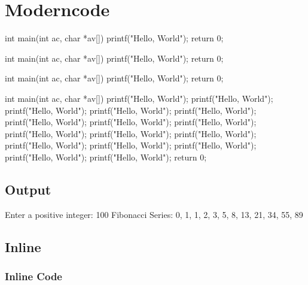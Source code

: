 \documentclass[10pt]{article}
\begin{document}
\section{Moderncode}

\begin{moderncode}[C][adjusted title={Title}]
int main(int ac, char *av[])
{
	printf("Hello, World");
	return 0;
}
\end{moderncode}

\begin{moderncode}[C][adjusted title={This title is very very very very very very very very very long}]
int main(int ac, char *av[])
{
	printf("Hello, World");
	return 0;
}
\end{moderncode}

\begin{moderncode}[C]
int main(int ac, char *av[])
{
	printf("Hello, World");
	return 0;
}
\end{moderncode}

\begin{moderncode}[C][adjusted title={This is a very long code}]
int main(int ac, char *av[])
{
	printf("Hello, World");
	printf("Hello, World");
	printf("Hello, World");
	printf("Hello, World");
	printf("Hello, World");
	printf("Hello, World");
	printf("Hello, World");
	printf("Hello, World");
	printf("Hello, World");
	printf("Hello, World");
	printf("Hello, World");
	printf("Hello, World");
	printf("Hello, World");
	printf("Hello, World");
	printf("Hello, World");
	printf("Hello, World");
	return 0;
}
\end{moderncode}


\subsection{Output}

\begin{moderncodeout}
Enter a positive integer: 100
Fibonacci Series: 0, 1, 1, 2, 3, 5, 8, 13, 21, 34, 55, 89
\end{moderncodeout}

\subsection{Inline}

\subsubsection{Inline Code}
\end{document}
